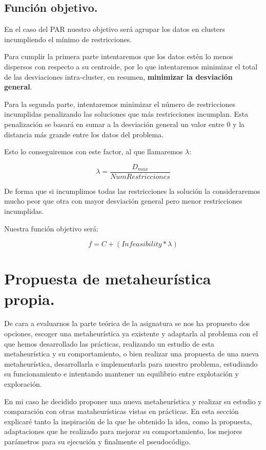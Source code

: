 \documentclass[12pt, spanish]{article}
\begin{document}
\subsection{Función objetivo.}

En el caso del PAR nuestro objetivo será agrupar los datos en clusters incumpliendo el mínimo de restricciones.

Para cumplir la primera parte intentaremos que los datos estén lo menos dispersos con respecto a su centroide, por lo que intentaremos minimizar el total de las desviaciones intra-cluster, en resumen, \textbf{minimizar la desviación general}.

Para la segunda parte, intentaremos minimizar el número de restricciones incumplidas penalizando las soluciones que más restricciones incumplan. Esta penalización se basará en sumar a la desviación general un valor entre 0 y la distancia más grande entre los datos del problema.

Esto lo conseguiremos con este factor, al que llamaremos $\lambda$:

$$ \lambda = \frac{D_{max}}{NumRestricciones} $$


De forma que si incumplimos todas las restricciones la solución la consideraremos mucho peor que otra con mayor desviación general pero menor restricciones incumplidas.

Nuestra función objetivo será:

$$ f = C + (\textit{Infeasibility} * \lambda) $$


\newpage

\section{Propuesta de metaheurística propia.}

De cara a evaluarnos la parte teórica de la asignatura se nos ha propuesto dos opciones, escoger una metaheurística ya existente y adaptarla al problema con el que hemos desarrollado las prácticas, realizando un estudio de esta metaheurística y su comportamiento, o bien realizar una propuesta de una nueva metaheurística, desarrollarla e implementarla para nuestro problema, estudiando su funcionamiento e intentando mantener un equilibrio entre explotación y exploración.

En mi caso he decidido proponer una nueva metaheurística y realizar su estudio y comparación con otras mataheurísticas vistas en prácticas. En esta sección explicaré tanto la inspiración de la que he obtenido la idea, como  la propuesta, adaptaciones que he realizado para mejorar su comportamiento, los mejores parámetros para su ejecución y finalmente el pseudocódigo.
\end{document}
